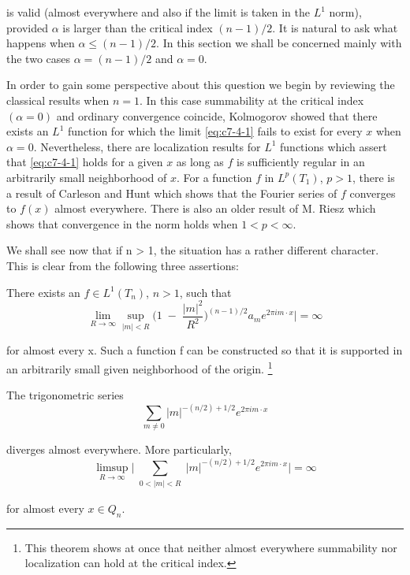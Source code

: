 is valid (almost everywhere and also if the limit is taken in the $L^1$ norm), provided $\alpha$ is larger than the critical index $(n - 1)/2$. It is natural to ask what happens when $\alpha \leq (n - 1)/2$. In this section we shall be concerned mainly with the two cases $\alpha = (n - 1)/2$ and $\alpha = 0$.

In order to gain some perspective about this question we begin by reviewing the classical results when $n = 1$. In this case summability at the critical index $(\alpha = 0)$ and ordinary convergence coincide, Kolmogorov showed that there exists an $L^1$ function for which the limit \eqref{eq:c7-4-1} fails to exist for every $x$ when $\alpha = 0$. Nevertheless, there are localization results for $L^1$ functions which assert that \eqref{eq:c7-4-1} holds for a given $x$ as long as $f$ is sufficiently regular in an arbitrarily small neighborhood of $x$. For a function $f$ in $L^p(T_1)$, $p > 1$, there is a result of Carleson and Hunt which shows that the Fourier series of $f$ converges to $f(x)$ almost everywhere. There is also an older result of M. Riesz which shows that convergence in the norm holds when $1 < p < \infty$.

We shall see now that if n > 1, the situation has a rather different character. This is clear from the following three assertions:

\begin{theorem}
\label{thm:c7-4-2}
There exists an $f\in L^{1}(T_{n})$, $n>1$, such that
\[
\lim_{R\to\infty}\sup_{|m|<R}\biggl(1\;-\;\frac{|m|^{2}}{R^{2}}\biggr)^{(n-1)/2}a_{m}e^{2\pi i m\cdot x}\biggr\vert=\infty
\]

for almost every x. Such a function f can be constructed so that it is supported in an arbitrarily small given neighborhood of the origin. \footnote{This theorem shows at once that neither almost everywhere summability nor localization can hold at the critical index.}
\end{theorem}

\begin{theorem}
\label{thm:c7-4-3}
The trigonometric series
\begin{equation}\label{eq:c7-4-4}
\sum_{m\neq0}\left|m\right|^{-(n/2)+1/2}e^{2\pi i m\cdot x}
\end{equation}

diverges almost everywhere. More particularly,
\[
\limsup_{R\to\infty}\bigg\vert\sum_{\substack{0<|m|<R}}|m|^{-(n/2)+1/2}e^{2\pi i m\cdot x}\bigg\vert=\infty
\]

for almost every $x \in Q_n$.
\end{theorem}

